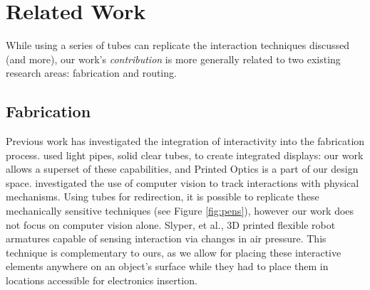 \section{Related Work}

While using a series of tubes can replicate the interaction techniques discussed (and more), our work's \emph{contribution} is more generally related to two existing research areas: fabrication and routing.

\subsection{Fabrication}

Previous work has investigated the integration of interactivity into the fabrication process.  \cite{Willis-printedoptics} used light pipes, solid clear tubes, to create integrated displays: our work allows a superset of these capabilities, and Printed Optics is a part of our design space.  \cite{Savage-sauron} investigated the use of computer vision to track interactions with physical mechanisms.  Using tubes for redirection, it is possible to replicate these mechanically sensitive techniques (see Figure \ref{fig:pens}), however our work does not focus on computer vision alone.  Slyper, et al., \cite{Slyper-pressure} 3D printed flexible robot armatures capable of sensing interaction via changes in air pressure.  This technique is complementary to ours, as we allow for placing these interactive elements anywhere on an object's surface while they had to place them in locations accessible for electronics insertion.

